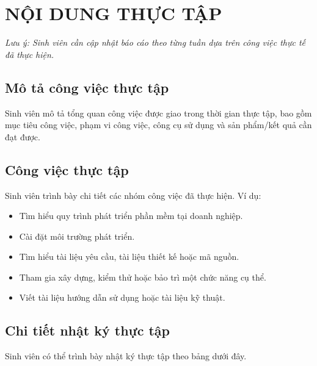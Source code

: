 \chapter{NỘI DUNG THỰC TẬP}

\textit{Lưu ý: Sinh viên cần cập nhật báo cáo theo từng tuần dựa trên công việc thực tế đã thực hiện.}

\section{Mô tả công việc thực tập}

Sinh viên mô tả tổng quan công việc được giao trong thời gian thực tập, bao gồm mục tiêu công việc, phạm vi công việc, công cụ sử dụng và sản phẩm/kết quả cần đạt được.

\section{Công việc thực tập}

Sinh viên trình bày chi tiết các nhóm công việc đã thực hiện. Ví dụ:

\begin{itemize}
    \item Tìm hiểu quy trình phát triển phần mềm tại doanh nghiệp.
    \item Cài đặt môi trường phát triển.
    \item Tìm hiểu tài liệu yêu cầu, tài liệu thiết kế hoặc mã nguồn.
    \item Tham gia xây dựng, kiểm thử hoặc bảo trì một chức năng cụ thể.
    \item Viết tài liệu hướng dẫn sử dụng hoặc tài liệu kỹ thuật.
\end{itemize}

\section{Chi tiết nhật ký thực tập}

Sinh viên có thể trình bày nhật ký thực tập theo bảng dưới đây.

